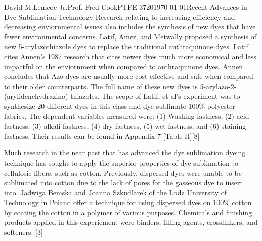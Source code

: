 \documentclass[12pt,letterpaper]{article}
\begin{document}
\begin{mla}{David M.}{Lemcoe Jr.}{Prof. Fred Cook}{PTFE 3720}{\today}{Recent Advances in Dye Sublimation Technology}
Research relating to increasing efficiency and decreasing enviornmental issues also includes the synthesis of new dyes that have fewer environmental concerns. Latif, Amer, and Metwally proposed a synthesis of new 5-arylazothiazole dyes to replace the traditional anthraquinone dyes. Latif cites Annen's 1987 research that cites newer dyes much more economical and less impactful on the enviornment when compared to anthraquinone dyes. Annen concludes that Azo dyes are usually more cost-effective and safe when compared to their older counterparts. The full name of these new dyes is 5-arylazo-2-(arylidenehydrazino)-thiazoles. The scope of Latif, et al's experiment was to synthesize 20 different dyes in this class and dye sublimate 100\% polyester fabrics. The dependent variables measured were: (1) Washing fastness, (2) acid fastness, (3) alkali fastness, (4) dry fastness, (5) wet fastness, and (6) staining fastness. Their results can be found in Appendix 7 [Table II][8]


Much research in the near past that has advanced the dye sublimation dyeing technique has sought to apply the superior properties of dye sublimation to cellulosic fibers, such as cotton. Previously, dispersed dyes were unable to be sublimated into cotton due to the lack of pores for the gasseous dye to insert into. Jadwiga Bemska and Joanna Szkudlarek of the Lodz University of Technology in Poland offer a technique for using dispersed dyes on 100\% cotton by coating the cotton in a polymer of various purposes. Chemicals and finishing products applied in this experiement were binders, filling agents, crosslinkers, and softeners. [3]


\end{mla}
\end{document}
